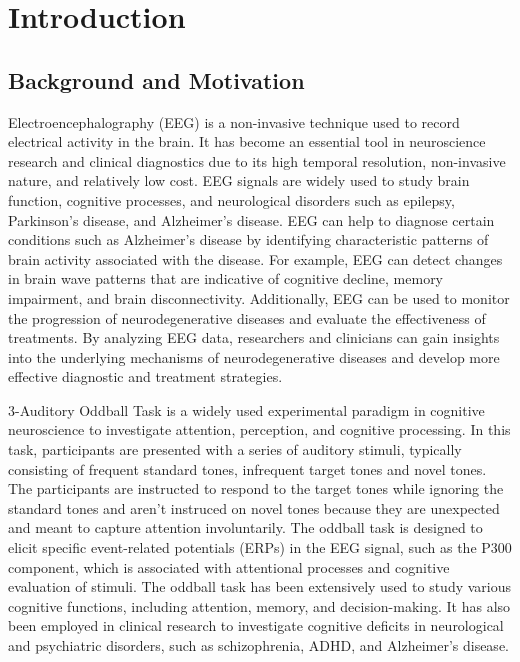 \documentclass[12pt]{report}
\begin{document}
\setcounter{tocdepth}{3} %
\tableofcontents

\listoftables
{}

\listoffigures
{}

\chapter{Introduction}

\section{Background and Motivation}
Electroencephalography (EEG) is a non-invasive technique used to record electrical activity in the brain. It has become an essential tool in neuroscience research and clinical diagnostics due to its high temporal resolution, non-invasive nature, and relatively low cost. EEG signals are widely used to study brain function, cognitive processes, and neurological disorders such as epilepsy, Parkinson's disease, and Alzheimer's disease. EEG can help to diagnose certain conditions such as Alzheimer's disease by identifying characteristic patterns of brain activity associated with the disease. For example, EEG can detect changes in brain wave patterns that are indicative of cognitive decline, memory impairment, and brain disconnectivity. Additionally, EEG can be used to monitor the progression of neurodegenerative diseases and evaluate the effectiveness of treatments. By analyzing EEG data, researchers and clinicians can gain insights into the underlying mechanisms of neurodegenerative diseases and develop more effective diagnostic and treatment strategies.

3-Auditory Oddball Task is a widely used experimental paradigm in cognitive neuroscience to investigate attention, perception, and cognitive processing. In this task, participants are presented with a series of auditory stimuli, typically consisting of frequent standard tones, infrequent target tones and novel tones. The participants are instructed to respond to the target tones while ignoring the standard tones and aren't instruced on novel tones because they are unexpected and meant to capture attention involuntarily.
The oddball task is designed to elicit specific event-related potentials (ERPs) in the EEG signal, such as the P300 component, which is associated with attentional processes and cognitive evaluation of stimuli. The oddball task has been extensively used to study various cognitive functions, including attention, memory, and decision-making. It has also been employed in clinical research to investigate cognitive deficits in neurological and psychiatric disorders, such as schizophrenia, ADHD, and Alzheimer's disease.
\end{document}
